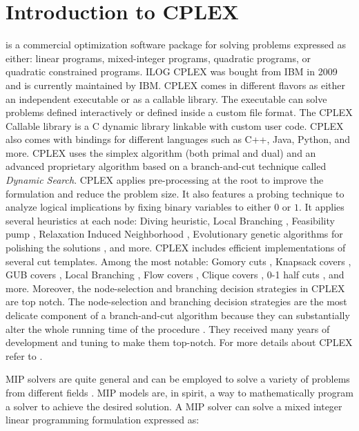 \chapter{Introduction to CPLEX}
\label{sec:introduction-to-cplex}

is a commercial optimization software package for solving problems expressed as either:
linear programs, mixed-integer programs, quadratic programs, or quadratic constrained programs.
ILOG CPLEX was bought from IBM in 2009 and is currently maintained by IBM.
CPLEX comes in different flavors as either an independent executable or as a callable library.
The executable can solve problems defined interactively or defined inside a custom file format.
The CPLEX Callable library is a C dynamic library linkable with custom user code.
CPLEX also comes with bindings for different languages such as C++, Java, Python, and more.
CPLEX uses the simplex algorithm (both primal and dual) and an advanced proprietary algorithm based on a branch-and-cut technique called \textit{Dynamic Search}.
CPLEX applies pre-processing at the root to improve the formulation and reduce the problem size.
It also features a probing technique to analyze logical implications by fixing binary variables to either $0$ or $1$.
It applies several heuristics at each node: Diving heuristic, Local Branching \parencite{fischetti2003}, Feasibility pump \parencite{fischetti2005}, Relaxation Induced Neighborhood \parencite{danna2005}, Evolutionary genetic algorithms for polishing the solutions \parencite{rothberg2007}, and more.
CPLEX includes efficient implementations of several cut templates.
Among the most notable: Gomory cuts \parencite{chvatal1973}, Knapsack covers \parencite{letchford2020lifting}, GUB covers \parencite{wolsey1990valid}, Local Branching \parencite{fischetti2003}, Flow covers \parencite{padberg1985valid}, Clique covers \parencite{brigham1983clique}, 0-1 half cuts \parencite{caprara1996}, and more.
Moreover, the node-selection and branching decision strategies in CPLEX are top notch.
The node-selection and branching decision strategies
are the most delicate component of a branch-and-cut algorithm
because they can substantially alter the whole running time of the procedure \parencite{lodi2013a}.
They received many years of development and tuning to make them top-notch.
For more details about CPLEX refer to \textcite{lima2010, lodi2013}.

MIP solvers are quite general and can be employed to solve a variety of problems from different fields \parencite{bixby2007progress}.
MIP models are, in spirit, a way to mathematically program a solver to achieve the desired solution.
A MIP solver can solve a mixed integer linear programming formulation expressed as:

